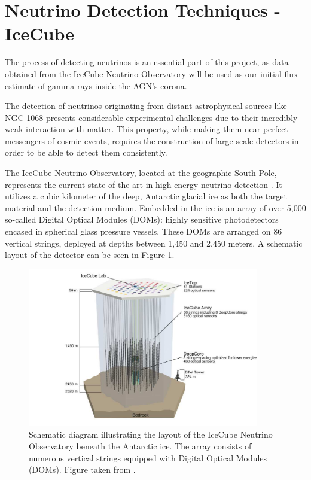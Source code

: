 \section{Neutrino Detection Techniques - IceCube}
\label{sec:Neutrino_Detection}

The process of detecting neutrinos is an essential part of this project, as data obtained from the IceCube Neutrino Observatory will be used as our initial flux estimate of gamma-rays inside the AGN's corona.

The detection of neutrinos originating from distant astrophysical sources like NGC 1068 presents considerable experimental challenges due to their incredibly weak interaction with matter. This property, while making them near-perfect messengers of cosmic events, requires the construction of large scale detectors in order to be able to detect them consistently.

The IceCube Neutrino Observatory, located at the geographic South Pole, represents the current state-of-the-art in high-energy neutrino detection \citep{IceCubeOverview2017}. It utilizes a cubic kilometer of the deep, Antarctic glacial ice as both the target material and the detection medium. Embedded in the ice is an array of over 5,000 so-called Digital Optical Modules (DOMs): highly sensitive photodetectors encased in spherical glass pressure vessels. These DOMs are arranged on 86 vertical strings, deployed at depths between 1,450 and 2,450 meters. A schematic layout of the detector can be seen in Figure \ref{fig:IceCube_layout}.

\begin{figure}[H]
    \centering
    \includegraphics[width=0.9\textwidth]{Figures/IceCube_Layout.pdf}
    \caption{Schematic diagram illustrating the layout of the IceCube Neutrino Observatory beneath the Antarctic ice. The array consists of numerous vertical strings equipped with Digital Optical Modules (DOMs). Figure taken from \citet{IceCubeOverview2017}.}
    \label{fig:IceCube_layout}
\end{figure}



